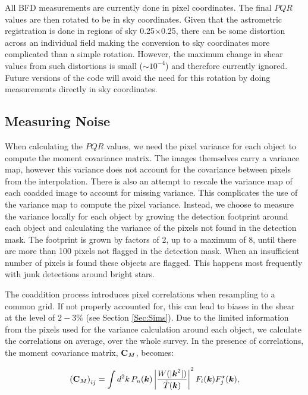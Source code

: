 \documentclass[useAMS,usenatbib]{mnras}
\newcommand{\veck}{\mbox{\boldmath $k$}}
\newcommand{\matC}{\mbox{$\bf C$}}
\begin{document}
All BFD measurements are currently done in pixel coordinates.  The final $PQR$ values are then rotated to be in sky coordinates.  Given that the astrometric registration is done in regions of sky 0.25\arcmin$\times$0.25\arcmin, there can be some distortion across an individual field making the conversion to sky coordinates more complicated than a simple rotation.  However, the maximum change in shear values from such distortions is small ($\sim 10^{-4}$) and therefore currently ignored.  Future versions of the code will avoid the need for this rotation by doing measurements directly in sky coordinates.

\subsection{Measuring Noise}
\label{Sec:Noise}
When calculating the $PQR$ values, we need the pixel variance for each object to compute the moment covariance matrix.  The images themselves carry a variance map, however this variance does not account for the covariance between pixels from the interpolation.  There is also an attempt to rescale the variance map of each coadded image to account for missing variance.  This complicates the use of the variance map to compute the pixel variance.  Instead, we choose to measure the variance locally for each object by growing the detection footprint around each object and calculating the variance of the pixels not found in the detection mask.  The footprint is grown by factors of 2, up to a maximum of 8, until there are more than 100 pixels not flagged in the detection mask.  When an insufficient number of pixels is found these objects are flagged.  This happens most frequently with junk detections around bright stars.

The coaddition process introduces pixel correlations when resampling to a common grid.  If not properly accounted for, this can lead to biases in the shear at the level of $2-3\%$ (see Section \ref{Sec:Sims}).  Due to the limited information from the pixels used for the variance calculation around each object, we calculate the correlations on average, over the whole survey.  In the presence of correlations, the moment covariance matrix, $\matC_M$, becomes:

\begin{equation}
\left(\matC_M\right)_{ij} = 
\int d^2k\, P_n(\veck) \left| \frac{W(|\veck^2|)}{\tilde T(\veck)}
\right|^2 F_i(\veck) F^\star_j(\veck),
\label{eqn:cov}
\end{equation}
\end{document}
